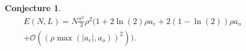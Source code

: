 \documentclass[final]{beamer}
\newcommand{\abs}[1]{\left\lvert #1 \right\rvert}
\newtheorem{mconjecture}{Conjecture}
\newlength{\sepwidth}
\newlength{\colwidth}
\newcommand{\separatorcolumn}{\begin{column}{\sepwidth}\end{column}}
\begin{document}
\begin{frame}[t]
\begin{columns}[t]
\begin{column}{\colwidth}
\begin{tcolorbox}[colframe=qmathblue,colback=qmathbluelyslyslys,title=Spin-1/2 conjecture]
\begin{mconjecture}
\begin{equation}
\begin{aligned}
			E(N,L)=N\frac{\pi^2}{3}\rho^2\Big(1+2\ln(2)\rho a_e+2(1-\ln(2))\rho a_o\\+\mathcal{O}\left((\rho\max(\abs{a_e},a_o))^2\right)\Big).
			\end{aligned}
			\end{equation}
		\end{mconjecture}
	\end{tcolorbox}
	\begin{tcolorbox}[colframe=qmathblue,colback=qmathbluelyslyslys,title=References]
		\vspace*{0.06 cm}
		
		{\fontsize{12}{14.1}\selectfont}
		\vspace*{0.06 cm}
	\end{tcolorbox}
	\end{column}	
	\separatorcolumn
	\end{columns}
	\end{frame}
\end{document}
